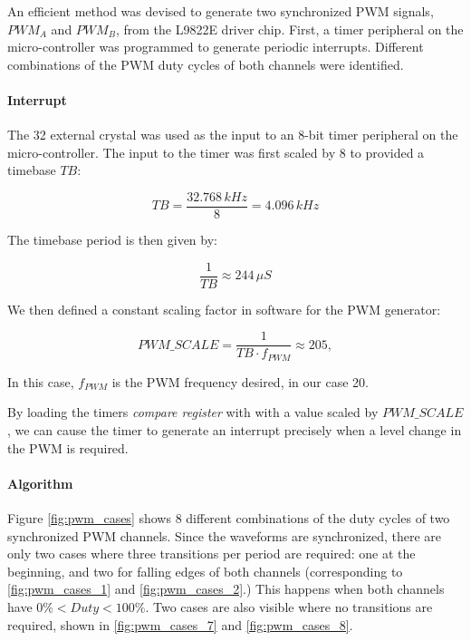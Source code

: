 An efficient method was devised to generate two synchronized PWM signals, $PWM_A$ and $PWM_B$, from the L9822E driver chip. First, a timer peripheral on the micro-controller was programmed to generate periodic interrupts. Different combinations of the PWM duty cycles of both channels were identified.

\paragraph{Interrupt} The \unit{32}{\kilo\hertz} external crystal was used as the input to an 8-bit timer peripheral on the micro-controller. The input to the timer was first scaled by 8 to provided a timebase $TB$:

\begin{equation}
TB=\frac{32.768\, kHz}{8}=4.096\, kHz
\end{equation}

The timebase period is then given by:

\begin{equation}
\frac{1}{TB}\approx244\,\mu{S}
\end{equation}

We then defined a constant scaling factor in software for the PWM generator:

\begin{equation}
{PWM\_SCALE}=\frac{1}{TB\cdot{f_{PWM}}}\approx205,
\end{equation}

In this case, $f_{PWM}$ is the PWM frequency desired, in our case \unit{20}{\hertz}.

By loading the timers \emph{compare register} with with a value scaled by ${PWM\_SCALE}$, we can cause the timer to generate an interrupt precisely when a level change in the PWM is required.

\paragraph{Algorithm}

Figure \ref{fig:pwm_cases} shows 8 different combinations of the duty cycles of two synchronized PWM channels. Since the waveforms are synchronized, there are only two cases where three transitions per period are required: one at the beginning, and two for falling edges of both channels (corresponding to \ref{fig:pwm_cases_1} and \ref{fig:pwm_cases_2}.) This happens when both channels have $0\%<Duty<100\%$. Two cases are also visible where no transitions are required, shown in \ref{fig:pwm_cases_7} and \ref{fig:pwm_cases_8}.

